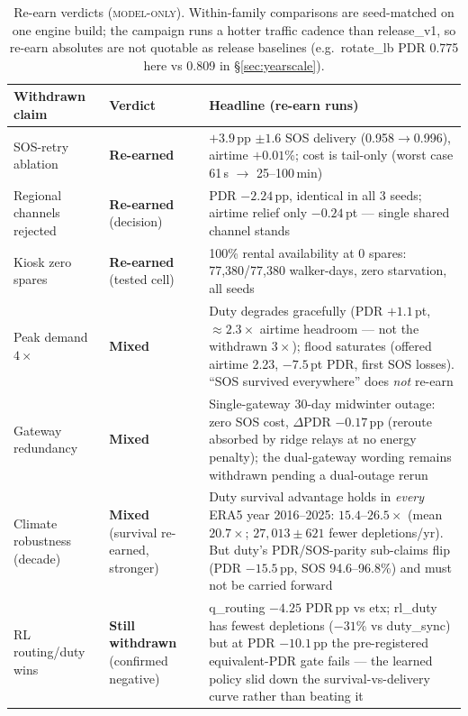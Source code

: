 \documentclass[11pt]{article}
\newcommand{\modelonly}{\textsc{model-only}}
\begin{document}
\begin{table}[h]
\small
\begin{tabularx}{\textwidth}{@{}p{3.4cm}p{2.6cm}X@{}}
\toprule
\textbf{Withdrawn claim} & \textbf{Verdict} & \textbf{Headline (re-earn runs)} \\
\midrule
SOS-retry ablation & \textbf{Re-earned} & $+3.9$\,pp $\pm 1.6$ SOS delivery (0.958$\to$0.996), airtime $+0.01$\%; cost is tail-only (worst case 61\,s $\to$ 25--100\,min) \\
Regional channels rejected & \textbf{Re-earned} (decision) & PDR $-2.24$\,pp, identical in all 3 seeds; airtime relief only $-0.24$\,pt --- single shared channel stands \\
Kiosk zero spares & \textbf{Re-earned} (tested cell) & 100\% rental availability at 0 spares: 77{,}380/77{,}380 walker-days, zero starvation, all seeds \\
Peak demand $4\times$ & \textbf{Mixed} & Duty degrades gracefully (PDR $+1.1$\,pt, ${\approx}2.3\times$ airtime headroom --- not the withdrawn $3\times$); flood saturates (offered airtime 2.23, $-7.5$\,pt PDR, first SOS losses). ``SOS survived everywhere'' does \emph{not} re-earn \\
Gateway redundancy & \textbf{Mixed} & Single-gateway 30-day midwinter outage: zero SOS cost, $\Delta$PDR $-0.17$\,pp (reroute absorbed by ridge relays at no energy penalty); the dual-gateway wording remains withdrawn pending a dual-outage rerun \\
Climate robustness (decade) & \textbf{Mixed} (survival re-earned, stronger) & Duty survival advantage holds in \emph{every} ERA5 year 2016--2025: $15.4$--$26.5\times$ (mean $20.7\times$; $27{,}013 \pm 621$ fewer depletions/yr). But duty's PDR/SOS-parity sub-claims flip (PDR $-15.5$\,pp, SOS 94.6--96.8\%) and must not be carried forward \\
RL routing/duty wins & \textbf{Still withdrawn} (confirmed negative) & q\_routing $-4.25$ PDR\,pp vs etx; rl\_duty has fewest depletions ($-31$\% vs duty\_sync) but at PDR $-10.1$\,pp the pre-registered equivalent-PDR gate fails --- the learned policy slid down the survival-vs-delivery curve rather than beating it \\
\bottomrule
\end{tabularx}
\caption{Re-earn verdicts (\modelonly). Within-family comparisons are
seed-matched on one engine build; the campaign runs a hotter traffic cadence
than release\_v1, so re-earn absolutes are not quotable as release baselines
(e.g.\ rotate\_lb PDR 0.775 here vs 0.809 in \S\ref{sec:yearscale}).}
\end{table}
\end{document}
